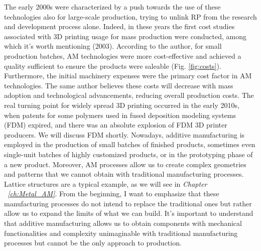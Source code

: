 The early 2000s were characterized by a push towards the use of these technologies also for large-scale production, trying to unlink RP from the research and development process alone. Indeed, in these years the first cost studies associated with 3D printing usage for mass production were conducted, among which it's worth mentioning \citeauthor{hopkinson_analysis_2003} (2003). According to the author, for small production batches, AM technologies were more cost-effective and achieved a quality sufficient to ensure the products were saleable (Fig. \ref{fig:costs}). Furthermore, the initial machinery expenses were the primary cost factor in AM technologies. The same author believes these costs will decrease with mass adoption and technological advancements, reducing overall production costs. The real turning point for widely spread 3D printing occurred in the early 2010s, when patents for some polymers used in fused deposition modeling systems (FDM) expired, and there was an absolute explosion of FDM 3D printer producers. We will discuss FDM shortly. Nowadays, additive manufacturing is employed in the production of small batches of finished products, sometimes even single-unit batches of highly customized products, or in the prototyping phase of a new product. Moreover, AM processes allow us to create complex geometries and patterns that we cannot obtain with traditional manufacturing processes. Lattice structures are a typical example, as we will see in \emph{Chapter ~\ref{ch:Metal_AM}}.
From the beginning, I want to emphasize that these manufacturing processes do not intend to replace the traditional ones but rather allow us to expand the limits of what we can build. It's important to understand that additive manufacturing allows us to obtain components with mechanical functionalities and complexity unimaginable with traditional manufacturing processes but cannot be the only approach to production.


